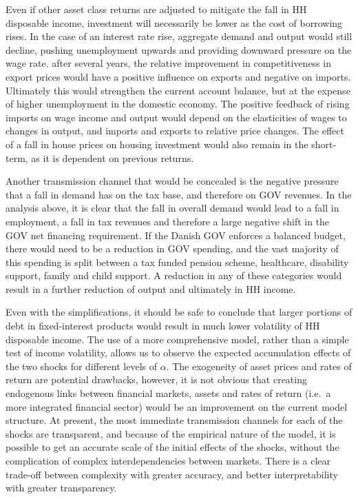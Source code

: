 \documentclass[
]{book}
\begin{document}
Even if other asset class returns are adjusted to mitigate the fall in HH disposable income, investment will necessarily be lower as the cost of borrowing rises. In the case of an interest rate rise, aggregate demand and output would still decline, pushing unemployment upwards and providing downward pressure on the wage rate. after several years, the relative improvement in competitiveness in export prices would have a positive influence on exports and negative on imports. Ultimately this would strengthen the current account balance, but at the expense of higher unemployment in the domestic economy. The positive feedback of rising imports on wage income and output would depend on the elasticities of wages to changes in output, and imports and exports to relative price changes. The effect of a fall in house prices on housing investment would also remain in the short-term, as it is dependent on previous returns.

Another transmission channel that would be concealed is the negative pressure that a fall in demand has on the tax base, and therefore on GOV revenues. In the analysis above, it is clear that the fall in overall demand would lead to a fall in employment, a fall in tax revenues and therefore a large negative shift in the GOV net financing requirement. If the Danish GOV enforces a balanced budget, there would need to be a reduction in GOV spending, and the vast majority of this spending is split between a tax funded pension scheme, healthcare, disability support, family and child support. A reduction in any of these categories would result in a further reduction of output and ultimately in HH income.

Even with the simplifications, it should be safe to conclude that larger portions of debt in fixed-interest products would result in much lower volatility of HH disposable income. The use of a more comprehensive model, rather than a simple test of income volatility, allows us to observe the expected accumulation effects of the two shocks for different levels of \(\alpha\). The exogeneity of asset prices and rates of return are potential drawbacks, however, it is not obvious that creating endogenous links between financial markets, assets and rates of return (i.e.~a more integrated financial sector) would be an improvement on the current model structure. At present, the most immediate transmission channels for each of the shocks are transparent, and because of the empirical nature of the model, it is possible to get an accurate scale of the initial effects of the shocks, without the complication of complex interdependencies between markets. There is a clear trade-off between complexity with greater accuracy, and better interpretability with greater transparency.
\end{document}
